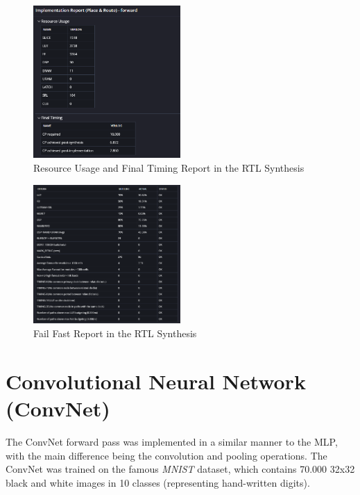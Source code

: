 \documentclass{article}
\begin{document}
\begin{figure}[H]
    \centering
    \includegraphics[width=0.5\textwidth]{./assets/MLP/implementation-resourceusagefinaltiming.png}
    \caption{Resource Usage and Final Timing Report in the RTL Synthesis}
    \label{fig:rtl-synthesis}
\end{figure}




\begin{figure}[H]
    \centering
    \includegraphics[width=0.5\textwidth]{./assets/MLP/implementation-failfast.png}
    \caption{Fail Fast Report in the RTL Synthesis}
    \label{fig:fail-fast}
\end{figure}

\newpage

\section{Convolutional Neural Network (ConvNet)}
The ConvNet forward pass was implemented in a similar manner to the MLP, with the main difference being the convolution and pooling operations. The ConvNet was trained on the famous \textit{MNIST} dataset, which contains 70.000 32x32 black and white images in 10 classes (representing hand-written digits).
\end{document}
